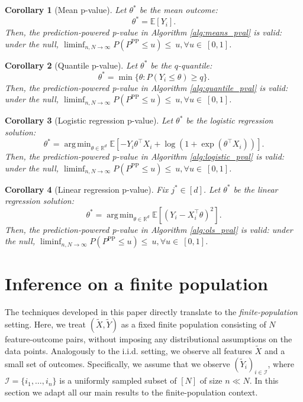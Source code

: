 \documentclass[10pt]{article}
\newtheorem{cor}{Corollary} %
\def\Ical{\mathcal{I}}
\def\R{\mathbb{R}}
\def\E{\mathbb{E}}
\newcommand{\Yt}{\widetilde{Y}}
\DeclareMathOperator*{\argmin}{arg\,min}
\begin{document}
\begin{cor}[Mean p-value]
\label{cor:mean_est_validity_pval} 
Let $\theta^*$ be the mean outcome:
$$\theta^* = \E[Y_i].$$
Then, the prediction-powered p-value in Algorithm \ref{alg:means_pval} is valid: under the null, $\liminf_{n,N\rightarrow\infty}P\left(P^{\mathrm{PP}}\leq u\right) \leq~u,\forall u\in~[0,1]$.
\end{cor}



\begin{cor}[Quantile p-value]
\label{cor:quantile_pval}
Let $\theta^*$ be the $q$-quantile: 
$$\theta^* = \min\{\theta: P(Y_i \leq \theta) \geq q\}.$$
Then, the prediction-powered p-value in Algorithm \ref{alg:quantile_pval} is valid: under the null, $\liminf_{n,N\rightarrow\infty}P\left(P^{\mathrm{PP}}\leq u\right) \leq~u,\forall u\in~[0,1]$.
\end{cor}



\begin{cor}[Logistic regression p-value]
\label{cor:logistic_pval}
Let $\theta^*$ be the logistic regression solution:
$$\theta^* = \argmin_{\theta\in\R^d} \E\left[-Y_i \theta^\top X_i + \log(1 + \exp(\theta^\top X_i))\right].$$
Then, the prediction-powered p-value in Algorithm \ref{alg:logistic_pval} is valid: under the null, $\liminf_{n,N\rightarrow\infty}P\left(P^{\mathrm{PP}}\leq u\right) \leq~u,\forall u\in~[0,1]$.
\end{cor}




\begin{cor}[Linear regression p-value]
\label{cor:ols_pval}
Fix $j^*\in[d]$. Let $\theta^*$ be the linear regression solution:
$$\theta^* = \argmin_{\theta\in\R^d} \E[(Y_i - X_i^\top\theta)^2].$$
Then, 
the prediction-powered p-value in Algorithm \ref{alg:ols_pval} is valid: under the null, $\liminf_{n,N\rightarrow\infty}P\left(P^{\mathrm{PP}}\leq u\right) \leq~u,\forall u\in~[0,1]$.
\end{cor}





\section{Inference on a finite population}
\label{app:finite-pop}

The techniques developed in this paper directly translate to the \emph{finite-population} setting. Here, we treat $(\tilde X,\tilde Y)$ as a fixed finite population consisting of $N$ feature-outcome pairs, without imposing any distributional assumptions on the data points. Analogously to the i.i.d. setting, we observe all features $\tilde X$ and a small set of outcomes. Specifically, we assume that we observe $(\Yt_i)_{i\in\Ical}$, where $\Ical = \{i_1,\dots,i_n\}$ is a uniformly sampled subset of $[N]$ of size $n \ll N$. In this section we adapt all our main results to the finite-population context.
\end{document}
